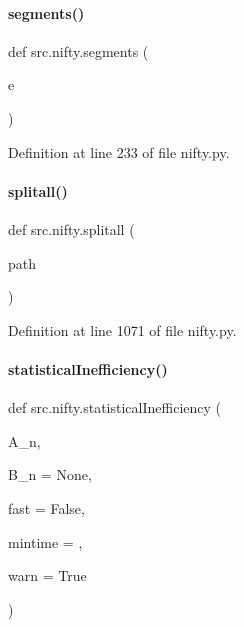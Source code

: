 \mbox{\label{namespacesrc_1_1nifty_a52ca7207d5f98f2fa46954903a417402}} 
\paragraph{\texorpdfstring{segments()}{segments()}}
{\footnotesize\ttfamily def src.\+nifty.\+segments (\begin{DoxyParamCaption}\item[{}]{e }\end{DoxyParamCaption})}



Definition at line 233 of file nifty.\+py.

\mbox{\label{namespacesrc_1_1nifty_aa4d2210e790bb92cc7f751ef306bb1c8}} 
\paragraph{\texorpdfstring{splitall()}{splitall()}}
{\footnotesize\ttfamily def src.\+nifty.\+splitall (\begin{DoxyParamCaption}\item[{}]{path }\end{DoxyParamCaption})}



Definition at line 1071 of file nifty.\+py.

\mbox{\label{namespacesrc_1_1nifty_a7e999b6e83b7bd69cdb8ec48d3b5bb78}} 
\paragraph{\texorpdfstring{statistical\+Inefficiency()}{statisticalInefficiency()}}
{\footnotesize\ttfamily def src.\+nifty.\+statistical\+Inefficiency (\begin{DoxyParamCaption}\item[{}]{A\+\_\+n,  }\item[{}]{B\+\_\+n = {\ttfamily None},  }\item[{}]{fast = {\ttfamily False},  }\item[{}]{mintime = {},  }\item[{}]{warn = {\ttfamily True} }\end{DoxyParamCaption})}



